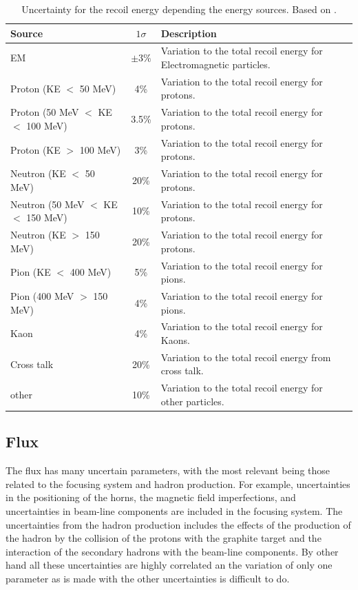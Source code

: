 \begin{table}[!htb]
    \centering
    \begin{tabular}{p{1.5in}|c|p{3in}}
        \hline 
        Source & $1\sigma$ & Description \\
        \hline  
        EM & $\pm3\%$ & Variation to the total recoil energy for Electromagnetic particles.\\ \hline
        Proton (KE $<$ 50 MeV) & 4\% & Variation to the total recoil energy for protons. \\ \hline
        Proton (50 MeV $<$ KE $<$ 100 MeV) & 3.5\% & Variation to the total recoil energy for protons.\\ \hline
        Proton (KE $>$ 100 MeV) & 3\% & Variation to the total recoil energy for protons. \\ \hline
        Neutron (KE $<$ 50 MeV) & 20\% & Variation to the total recoil energy for protons. \\ \hline
        Neutron (50 MeV $<$ KE $<$ 150 MeV) & 10\% & Variation to the total recoil energy for protons. \\ \hline
        Neutron (KE $>$ 150 MeV) & 20\% & Variation to the total recoil energy for protons. \\ \hline
        Pion (KE $<$ 400 MeV) & 5\% & Variation to the total recoil energy for pions. \\ \hline
        Pion (400 MeV  $>$ 150 MeV) & 4\% & Variation to the total recoil energy for pions. \\ \hline
        Kaon & 4\% & Variation to the total recoil energy for Kaons. \\ \hline
        Cross talk & 20\% & Variation to the total recoil energy from cross talk. \\ \hline
        other & 10\% & Variation to the total recoil energy for other particles. \\ \hline
    \end{tabular}
    \caption{Uncertainty for the recoil energy depending the energy sources. Based on \cite{BenThesis}.}
    \label{tab:ErrorAnalysis:SystematicUnc:dEdx}
\end{table}

\pagebreak


\subsection{Flux}
\label{Cap:ErrorAnalysis:SystematicUnc:Flux}

The flux has many uncertain parameters, with the most relevant being those related to the focusing system and hadron production. For example, uncertainties in the positioning of the horns, the magnetic field imperfections, and uncertainties in beam-line components are included in the focusing system. The uncertainties from the hadron production includes the effects of the production of the hadron by the collision of the protons with the graphite target and the interaction of the secondary hadrons with the beam-line components. By other hand all these uncertainties are highly correlated an the variation of only one parameter as is made with the other uncertainties is difficult to do. 

